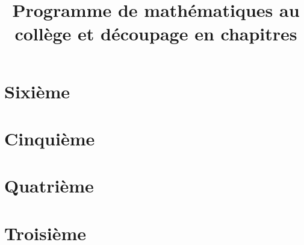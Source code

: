 \documentclass[12pt,a4paper]{article}
\author{}
\date{}
\title{Programme de mathématiques au collège et découpage en chapitres}
\begin{document}
\maketitle

\section{Sixième}

\twoCol{}

\newpage
\section{Cinquième}

\twoCol{}
\newpage
\section{Quatrième}

\twoCol{}
\newpage
\section{Troisième}

\twoCol{}
\end{document}
